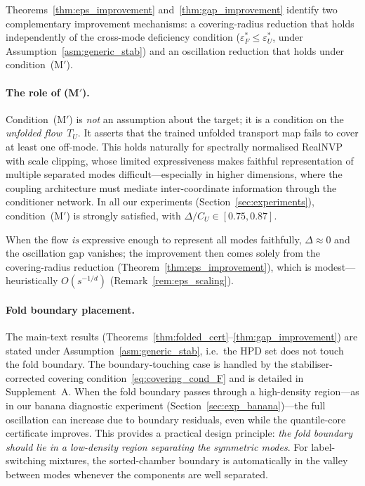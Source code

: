 Theorems~\ref{thm:eps_improvement} and~\ref{thm:gap_improvement}
identify two complementary improvement mechanisms: a covering-radius
reduction that holds independently of the cross-mode deficiency
condition ($\varepsilon_F^* \leq \varepsilon_U^*$, under
Assumption~\ref{asm:generic_stab}) and an oscillation
reduction that holds under condition~(M$'$).

\paragraph{The role of (M$'$).}
Condition~(M$'$) is \emph{not} an assumption about the target; it is
a condition on the \emph{unfolded flow}~$T_U$.  It asserts that the
trained unfolded transport map fails to cover at least one off-mode.  This holds
naturally for spectrally normalised RealNVP with scale clipping,
whose limited expressiveness makes faithful representation of
multiple separated modes difficult---especially in higher dimensions,
where the coupling architecture must mediate inter-coordinate
information through the conditioner network.  In all our experiments
(Section~\ref{sec:experiments}), condition~(M$'$) is strongly
satisfied, with $\Delta/C_U \in [0.75, 0.87]$.

When the flow \emph{is} expressive enough to represent all modes
faithfully, $\Delta \approx 0$ and the oscillation gap vanishes;
the improvement then comes solely from the covering-radius
reduction (Theorem~\ref{thm:eps_improvement}), which is
modest---heuristically $O(s^{-1/d})$
(Remark~\ref{rem:eps_scaling}).

\paragraph{Fold boundary placement.}
The main-text results
(Theorems~\ref{thm:folded_cert}--\ref{thm:gap_improvement})
are stated under Assumption~\ref{asm:generic_stab}, i.e.\ the HPD
set does not touch the fold boundary.  The boundary-touching case
is handled by the stabiliser-corrected covering
condition~\eqref{eq:covering_cond_F} and is detailed in
Supplement~A.
When the fold boundary passes
through a high-density region---as in our banana diagnostic
experiment (Section~\ref{sec:exp_banana})---the full oscillation
can increase due to boundary residuals, even while the
quantile-core certificate improves.  This provides a practical
design principle: \emph{the fold boundary should lie in a
low-density region separating the symmetric modes}.
For label-switching mixtures, the sorted-chamber boundary
is automatically in the valley between modes whenever the
components are well separated.

